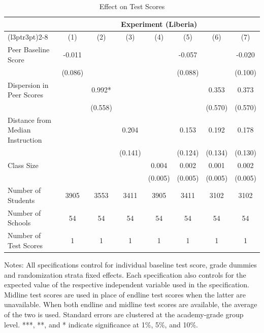 \begin{table}[!h]
\centering\centering\centering
\caption{Effect on Test Scores}
\centering
\begin{threeparttable}
\fontsize{10}{12}\selectfont
\begin{tabular}[t]{lccccccc}
\toprule
\multicolumn{1}{c}{ } & \multicolumn{7}{c}{Experiment (Liberia)} \\
\cmidrule(l{3pt}r{3pt}){2-8}
  & (1) & (2) & (3) & (4) & (5) & (6) & (7)\\
\midrule
Peer Baseline Score & -0.011 &  &  &  & -0.057 &  & -0.020\\
 & (0.086) &  &  &  & (0.088) &  & (0.100)\\
Dispersion in Peer Scores &  & 0.992* &  &  &  & 0.353 & 0.373\\
 &  & (0.558) &  &  &  & (0.570) & (0.570)\\
Distance from Median Instruction &  &  & 0.204 &  & 0.153 & 0.192 & 0.178\\
 &  &  & (0.141) &  & (0.124) & (0.134) & (0.130)\\
Class Size &  &  &  & 0.004 & 0.002 & 0.001 & 0.002\\
 &  &  &  & (0.005) & (0.005) & (0.005) & (0.005)\\
\hline
\midrule
Number of Students & 3905 & 3553 & 3411 & 3905 & 3411 & 3102 & 3102\\
Number of Schools & 54 & 54 & 54 & 54 & 54 & 54 & 54\\
Number of Test Scores & 1 & 1 & 1 & 1 & 1 & 1 & 1\\
\bottomrule
\end{tabular}
\begin{tablenotes}[para]
\item Notes:
                      All specifications control for individual baseline test score,
                        grade dummies and randomization strata fixed effects. Each specification
                        also controls for the expected value of the respective independent variable
                         used in the specification. Midline test scores are used in place of endline test scores when the latter are unavailable. 
                         When both endline and midline test scores are available, the average of the two is used. 
                         Standard errors are clustered at the academy-grade
                          group level. ***, **, and * indicate significance at 1\%, 5\%, and 10\%.
\end{tablenotes}
\end{threeparttable}
\end{table}
